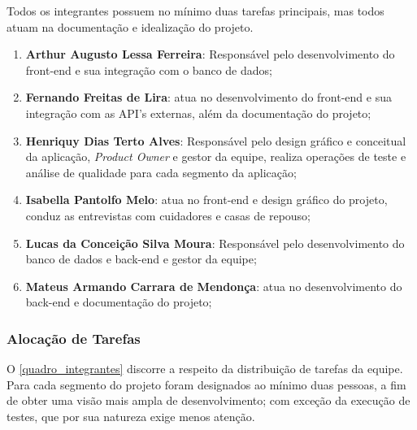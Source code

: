 \documentclass[
	article,			%
	12pt,				%
	oneside,			%
	a4paper,			%
    BIBLATEX,           %
	english,			%
	brazil,				%
	sumario=tradicional
	]{abntex2}
\begin{document}
Todos os integrantes possuem no mínimo duas tarefas principais, mas todos atuam na documentação e idealização do projeto.

\begin{enumerate}
    \item \textbf{Arthur Augusto Lessa Ferreira}: Responsável pelo desenvolvimento do front-end e sua integração com o banco de dados;
    \item \textbf{Fernando Freitas de Lira}: atua no desenvolvimento do front-end e sua integração com as API's externas, além da documentação do projeto;
    \item \textbf{Henriquy Dias Terto Alves}: Responsável pelo design gráfico e conceitual da aplicação, \textit{Product Owner} e gestor da equipe, realiza operações de teste e análise de qualidade para cada segmento da aplicação;
    \item \textbf{Isabella Pantolfo Melo}: atua no front-end e design gráfico do projeto, conduz as entrevistas com cuidadores e casas de repouso;
    \item \textbf{Lucas da Conceição Silva Moura}: Responsável pelo desenvolvimento do banco de dados e back-end e gestor da equipe;
    \item \textbf{Mateus Armando Carrara de Mendonça}: atua no desenvolvimento do back-end e documentação do projeto;
\end{enumerate}

\subsubsection{Alocação de Tarefas}

O \autoref{quadro_integrantes} discorre a respeito da distribuição de tarefas da equipe. Para cada segmento do projeto foram designados ao mínimo duas pessoas, a fim de obter uma visão mais ampla de desenvolvimento; com exceção da execução de testes, que por sua natureza exige menos atenção. 
\end{document}

